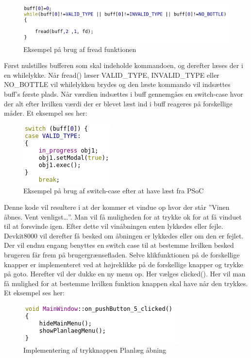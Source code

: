 \begin{figure}[H]
\includegraphics{Billeder/read}
\caption{Eksempel på brug af fread funktionen}
\end{figure}

Først nulstilles bufferen som skal indeholde kommandoen, og derefter læses der i en whilelykke. Når fread() læser VALID{\_}TYPE, INVALID{\_}TYPE eller NO{\_}BOTTLE vil whilelykken brydes og den læste kommando vil indsættes buff’s første plads. Når værdien indsættes i buff gennemgåes en switch-case hvor der alt efter hvilken værdi der er blevet læst ind i buff reageres på forskellige måder. Et eksempel ses her:

\begin{figure}[H]
\includegraphics{Billeder/switch}
\caption{Eksempel på brug af switch-case efter at have læst fra PSoC}
\end{figure}

Denne kode vil resultere i at der kommer et vindue op hvor der står ”Vinen åbnes. Vent venligst…”. Man vil få muligheden for at trykke ok for at få vinduet til at forsvinde igen. 
Efter dette vil vinåbningen enten lykkedes eller fejle. Devkit8000 vil derefter få besked om åbningen er lykkedes eller om den er fejlet. Der vil endnu engang benyttes en switch case til at bestemme hvilken besked brugeren får frem på brugergrænsefladen.
Selve klikfunktionen på de forskellige knapper er implementeret ved at højreklikke på de forskellige knapper og trykke på goto. Herefter vil der dukke en ny menu op. Her vælges clicked(). Her vil man få mulighed for at bestemme hvilken funktion knappen skal have når den trykkes. Et eksempel ses her:

\begin{figure}[H]
\includegraphics{Billeder/pushButton}
\caption{Implementering af trykknappen Planlæg åbning}
\end{figure}

